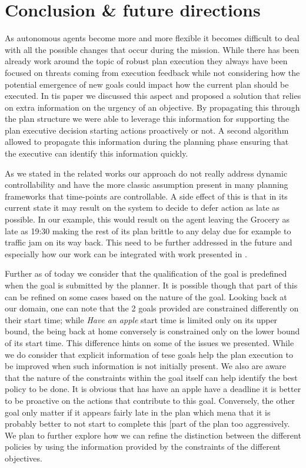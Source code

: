
\section{Conclusion \& future directions}
\label{sec:conclude}



As autonomous agents become more and more flexible it becomes difficult to deal with all the possible changes that occur during the mission. While there has been already work around the topic of robust plan execution they always have been focused on threats coming from execution feedback while not considering how the potential emergence 
of new goals could impact how the current plan should be executed. In tis paper we discussed this aspect and proposed a solution that relies on extra information on the urgency of an objective. By propagating this through the plan structure we were able to 
leverage this information for supporting the plan executive decision starting actions proactively or not. A second algorithm allowed to propagate this information during the planning phase ensuring that the executive can identify this information quickly. 

As we stated in the related works our approach do not really address dynamic 
controllability and have the more classic assumption present in many planning 
frameworks that time-points are controllable. A side effect of this is that in its current state it may result on the system to decide to defer action as late as possible. In our example, this would result on the agent leaving the Grocery as late as 19:30 making the rest of its plan brittle to any delay due for example to traffic jam on its way back. This need to be further addressed in the future and especially how our work can be integrated with work presented in \cite{morris01}. 

Further as of today we consider that the qualification of the goal is predefined when the goal is submitted by the planner. It is possible though that part of this can be refined on some cases based on the nature  of the goal. Looking back at our domain, one can note that the 2 goals provided are constrained differently on their start time; while {\em Have an  apple} start time is limited only on its upper bound, the being back at home conversely is constrained only on the lower bound of its start time. This difference hints on some of the issues we presented. While we do consider that explicit information of tese goals help the plan execution to be improved when such information is not initially present. We also are aware that the nature of the constraints within the goal itself can help identify the best policy to be done. It is obvious that has have an apple have a deadline it is better to be proactive on the actions that contribute to this goal. Conversely, the other goal only matter if it appears fairly late in the plan which mena that it is probably better to not start to complete this [part of the plan too aggressively. We plan to further explore how we can refine the distinction between the different policies by using the information provided by the constraints of the different objectives. 
 

